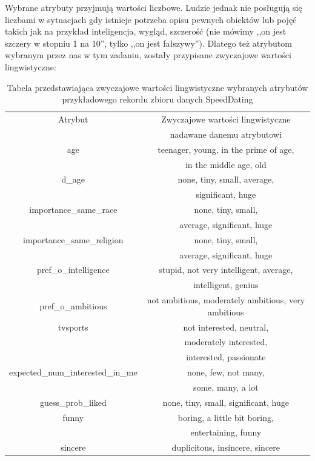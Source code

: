 \documentclass{classrep}
\begin{document}
Wybrane atrybuty przyjmują wartości liczbowe. Ludzie jednak nie posługują się liczbami w sytuacjach gdy istnieje potrzeba opisu pewnych obiektów lub pojęć takich jak na przykład inteligencja, wygląd, szczerość (nie mówimy ,,on jest szczery w stopniu 1 na 10'', tylko ,,on jest fałszywy''). Dlatego też atrybutom wybranym przez nas w tym zadaniu, zostały przypisane zwyczajowe wartości lingwistyczne:
\begin{table}[H]
\centering
\begin{tabular}{|c|c|}
\hline
Atrybut & Zwyczajowe wartości lingwistyczne \\ & nadawane danemu atrybutowi \\ \hline
age & teenager, young, in the prime of age, \\ & in the middle age, old\\ \hline
d\_age & none, tiny, small, average,\\ &  significant, huge \\ \hline
importance\_same\_race & none, tiny, small, \\ & average, significant, huge \\ \hline
importance\_same\_religion & none, tiny, small, \\ & average, significant, huge \\ \hline
pref\_o\_intelligence & stupid, not very intelligent, average, \\ & intelligent, genius \\ \hline
pref\_o\_ambitious & not ambitious, moderately ambitious, very ambitious \\ \hline
tvsports & not interested, neutral, \\ & moderately interested, \\ & interested, passionate \\ \hline
expected\_num\_interested\_in\_me & none, few, not many, \\ & some, many, a lot \\ \hline
guess\_prob\_liked & none, tiny, small, significant, huge \\ \hline
funny & boring, a little bit boring, \\ & entertaining, funny \\ \hline
sincere & duplicitous, insincere, sincere \\ \hline
\end{tabular}
\caption{Tabela przedstawiająca zwyczajowe wartości lingwistyczne wybranych atrybutów przykładowego rekordu zbioru danych SpeedDating \cite{database}}
\end{table}
\end{document}
